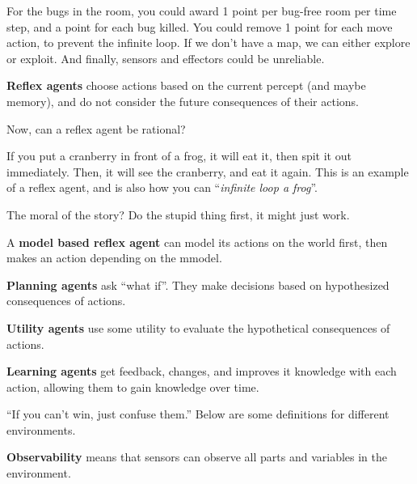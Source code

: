 \begin{eg}
	For the bugs in the room, you could award 1 point per bug-free room per time step, and a point for each bug killed. You could remove 1 point for each move action, to prevent the infinite loop. If we don't have a map, we can either explore or exploit. And finally, sensors and effectors could be unreliable.
\end{eg}

\begin{definition}
	\textbf{Reflex agents} choose actions based on the current percept (and maybe memory), and do not consider the future consequences of their actions.
\end{definition}

Now, can a reflex agent be rational?

\begin{eg}
	If you put a cranberry in front of a frog, it will eat it, then spit it out immediately. Then, it will see the cranberry, and eat it again. This is an example of a reflex agent, and is also how you can ``\textit{infinite loop a frog}''.
\end{eg}

The moral of the story? Do the stupid thing first, it might just work.

\begin{definition}
	A \textbf{model based reflex agent} can model its actions on the world first, then makes an action depending on the mmodel.
\end{definition}

\begin{definition}
	\textbf{Planning agents} ask ``what if''. They make decisions based on hypothesized consequences of actions.
\end{definition}

\begin{definition}
	\textbf{Utility agents} use some utility to evaluate the hypothetical consequences of actions.
\end{definition}

\begin{definition}
	\textbf{Learning agents} get feedback, changes, and improves it knowledge with each action, allowing them to gain knowledge over time.
\end{definition}

``If you can't win, just confuse them.'' Below are some definitions for different environments.

\begin{definition}
	\textbf{Observability} means that sensors can observe all parts and variables in the environment.
\end{definition}

